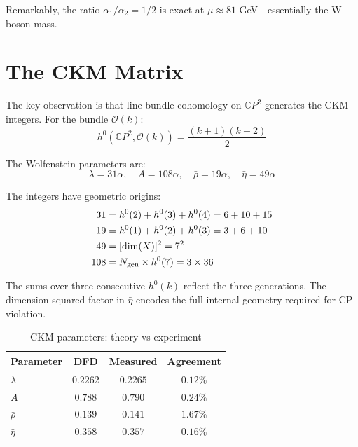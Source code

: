 \documentclass[aps,prl,twocolumn,superscriptaddress]{revtex4-2}
\begin{document}
Remarkably, the ratio $\alpha_1/\alpha_2 = 1/2$ is exact at
$\mu \approx 81$ GeV---essentially the W boson mass.

\section{The CKM Matrix}

The key observation is that line bundle cohomology on $\mathbb{C}P^2$
generates the CKM integers. For the bundle $\mathcal{O}(k)$:
\begin{equation}
h^0(\mathbb{C}P^2, \mathcal{O}(k)) = \frac{(k+1)(k+2)}{2}
\end{equation}

The Wolfenstein parameters are:
\begin{equation}
\lambda = 31\alpha, \quad A = 108\alpha, \quad
\bar{\rho} = 19\alpha, \quad \bar{\eta} = 49\alpha
\end{equation}

The integers have geometric origins:
\begin{align}
31 &= h^0(2) + h^0(3) + h^0(4) = 6 + 10 + 15 \notag \\
19 &= h^0(1) + h^0(2) + h^0(3) = 3 + 6 + 10 \notag \\
49 &= [\dim(X)]^2 = 7^2 \notag \\
108 &= N_{\rm gen} \times h^0(7) = 3 \times 36
\end{align}

The sums over three consecutive $h^0(k)$ reflect the three generations.
The dimension-squared factor in $\bar{\eta}$ encodes the full internal
geometry required for CP violation.

\begin{table}[b]
\caption{CKM parameters: theory vs experiment}
\begin{ruledtabular}
\begin{tabular}{lccc}
Parameter & DFD & Measured & Agreement \\
\hline
$\lambda$ & $0.2262$ & $0.2265$ & $0.12\%$ \\
$A$ & $0.788$ & $0.790$ & $0.24\%$ \\
$\bar{\rho}$ & $0.139$ & $0.141$ & $1.67\%$ \\
$\bar{\eta}$ & $0.358$ & $0.357$ & $0.16\%$ \\
\end{tabular}
\end{ruledtabular}
\end{table}
\end{document}
